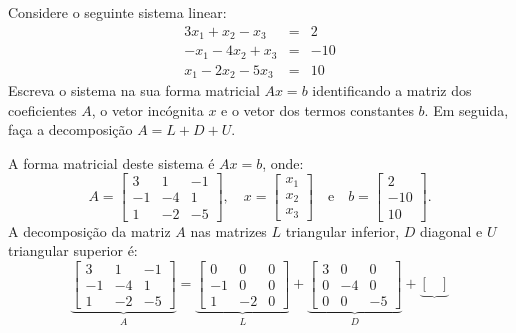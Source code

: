 \begin{ex}\label{ex:sislin}
  Considere o seguinte sistema linear:
  \begin{eqnarray}
    3x_1 + x_2 - x_3 &=& 2\\
    -x_1 -4x_2 + x_3 &=& -10\\
    x_1 - 2x_2 - 5x_3 &=& 10
  \end{eqnarray}
Escreva o sistema na sua forma matricial $Ax = b$ identificando a matriz dos coeficientes $A$, o vetor incógnita $x$ e o vetor dos termos constantes $b$. Em seguida, faça a decomposição $A = L + D + U$.
\end{ex}
\begin{sol}
 A forma matricial deste sistema é $Ax = b$, onde:
\begin{equation}
  A =
  \begin{bmatrix}
    3 & 1 & -1\\
    -1 & -4 & 1\\
    1 & -2 & -5
  \end{bmatrix},\quad
  x =
  \begin{bmatrix}
    x_1\\
    x_2\\
    x_3
  \end{bmatrix}\quad\text{e}\quad
  b =
  \begin{bmatrix}
    2\\
    -10\\
    10
  \end{bmatrix}.
\end{equation}
A decomposição da matriz $A$ nas matrizes $L$ triangular inferior, $D$ diagonal e $U$ triangular superior é:
\begin{equation}
  \underbrace{\begin{bmatrix}
    3 & 1 & -1\\
    -1 & -4 & 1\\
    1 & -2 & -5
  \end{bmatrix}}_{A} =
  \underbrace{\begin{bmatrix}
    0 & 0 & 0\\
    -1 & 0 & 0\\
    1 & -2 & 0
  \end{bmatrix}}_{L} +
  \underbrace{\begin{bmatrix}
    3 & 0 & 0\\
    0 & -4 & 0\\
    0 & 0 & -5
  \end{bmatrix}}_{D} +
  \underbrace{\begin{bmatrix}

\end{bmatrix}}
\end{equation}
\end{sol}
